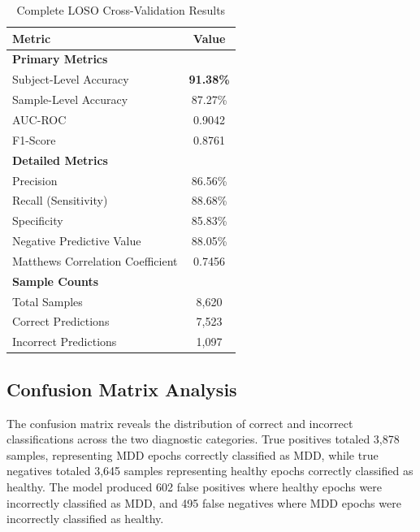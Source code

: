 \begin{table}[H]
    \centering
    \small
    \caption{Complete LOSO Cross-Validation Results}
    \label{tab:results_summary}
    \begin{tabularx}{\textwidth}{|X|c|}
        \hline
        \textbf{Metric} & \textbf{Value} \\
        \hline
        \multicolumn{2}{|l|}{\textbf{Primary Metrics}} \\
        \hline
        Subject-Level Accuracy & \textbf{91.38\%} \\
        \hline
        Sample-Level Accuracy & 87.27\% \\
        \hline
        AUC-ROC & 0.9042 \\
        \hline
        F1-Score & 0.8761 \\
        \hline
        \multicolumn{2}{|l|}{\textbf{Detailed Metrics}} \\
        \hline
        Precision & 86.56\% \\
        \hline
        Recall (Sensitivity) & 88.68\% \\
        \hline
        Specificity & 85.83\% \\
        \hline
        Negative Predictive Value & 88.05\% \\
        \hline
        Matthews Correlation Coefficient & 0.7456 \\
        \hline
        \multicolumn{2}{|l|}{\textbf{Sample Counts}} \\
        \hline
        Total Samples & 8,620 \\
        \hline
        Correct Predictions & 7,523 \\
        \hline
        Incorrect Predictions & 1,097 \\
        \hline
    \end{tabularx}
\end{table}

\subsection{Confusion Matrix Analysis}

The confusion matrix reveals the distribution of correct and incorrect classifications across the two diagnostic categories. True positives totaled 3,878 samples, representing MDD epochs correctly classified as MDD, while true negatives totaled 3,645 samples representing healthy epochs correctly classified as healthy. The model produced 602 false positives where healthy epochs were incorrectly classified as MDD, and 495 false negatives where MDD epochs were incorrectly classified as healthy.

